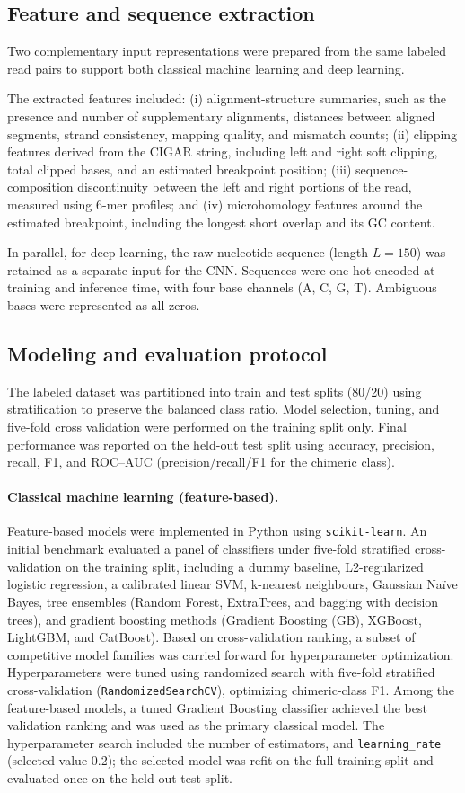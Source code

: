 \subsection{Feature and sequence extraction}
Two complementary input representations were prepared from the same labeled read pairs to support both classical machine learning and deep learning.

The extracted features included: (i) alignment-structure summaries, such as the presence and number of supplementary alignments, distances between aligned segments, strand consistency, mapping quality, and mismatch counts; (ii) clipping features derived from the CIGAR string, including left and right soft clipping, total clipped bases, and an estimated breakpoint position; (iii) sequence-composition discontinuity between the left and right portions of the read, measured using 6-mer profiles; and (iv) microhomology features around the estimated breakpoint, including the longest short overlap and its GC content.

In parallel, for deep learning, the raw nucleotide sequence (length $L=150$) was retained as a separate input for the CNN. Sequences were one-hot encoded at training and inference time, with four base channels (A, C, G, T). Ambiguous bases were represented as all zeros.

\subsection{Modeling and evaluation protocol}
The labeled dataset was partitioned into train and test splits (80/20) using stratification to preserve the balanced class ratio. Model selection, tuning, and five-fold cross validation were performed on the training split only. Final performance was reported on the held-out test split using accuracy, precision, recall, F1, and ROC--AUC (precision/recall/F1 for the chimeric class).

\paragraph{Classical machine learning (feature-based).}
Feature-based models were implemented in Python using \texttt{scikit-learn}. An initial benchmark evaluated a panel of classifiers under five-fold stratified cross-validation on the training split, including a dummy baseline, L2-regularized logistic regression, a calibrated linear SVM, k-nearest neighbours, Gaussian Na\"ive Bayes, tree ensembles (Random Forest, ExtraTrees, and bagging with decision trees), and gradient boosting methods (Gradient Boosting (GB), XGBoost, LightGBM, and CatBoost). Based on cross-validation ranking, a subset of competitive model families was carried forward for hyperparameter optimization. Hyperparameters were tuned using randomized search with five-fold stratified cross-validation (\texttt{RandomizedSearchCV}), optimizing chimeric-class F1. Among the feature-based models, a tuned Gradient Boosting classifier achieved the best validation ranking and was used as the primary classical model. The hyperparameter search included the number of estimators, and \texttt{learning\_rate} (selected value 0.2); the selected model was refit on the full training split and evaluated once on the held-out test split.
